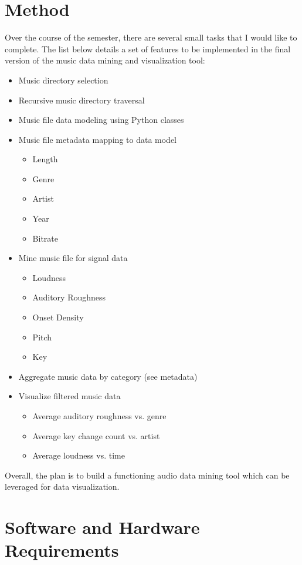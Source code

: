 \documentclass[12pt, a4paper]{article}
\begin{document}
\section*{Method}

Over the course of the semester, there are several small tasks that I would like
to complete. The list below details a set of features to be implemented in the
final version of the music data mining and visualization tool:

\begin{itemize}
  \item Music directory selection
  \item Recursive music directory traversal
  \item Music file data modeling using Python classes
  \item Music file metadata mapping to data model
  \begin{itemize}
    \item Length
    \item Genre
    \item Artist
    \item Year
    \item Bitrate
  \end{itemize}
  \item Mine music file for signal data
  \begin{itemize}
    \item Loudness
    \item Auditory Roughness
    \item Onset Density
    \item Pitch
    \item Key
  \end{itemize}
  \item Aggregate music data by category (see metadata)
  \item Visualize filtered music data
  \begin{itemize}
    \item Average auditory roughness vs. genre
    \item Average key change count vs. artist
    \item Average loudness vs. time
  \end{itemize}
\end{itemize}

Overall, the plan is to build a functioning audio data mining tool which can be
leveraged for data visualization.

\section*{Software and Hardware Requirements}
\end{document}
